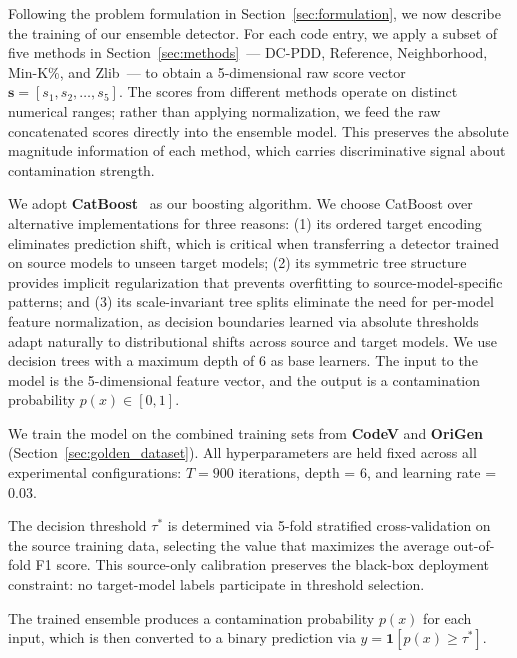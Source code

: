 Following the problem formulation in Section~\ref{sec:formulation}, we now describe the training of our ensemble detector. For each code entry, we apply a subset of five methods in Section~\ref{sec:methods}~— DC-PDD, Reference, Neighborhood, Min-K\%, and Zlib~— to obtain a 5-dimensional raw score vector \(\mathbf{s} = [s_1, s_2, \ldots, s_5]\). The scores from different methods operate on distinct numerical ranges; rather than applying normalization, we feed the raw concatenated scores directly into the ensemble model. This preserves the absolute magnitude information of each method, which carries discriminative signal about contamination strength.

We adopt \textbf{CatBoost}~\cite{prokhorenkova2018catboost} as our boosting algorithm. We choose CatBoost over alternative implementations for three reasons: (1) its ordered target encoding eliminates prediction shift, which is critical when transferring a detector trained on source models to unseen target models; (2) its symmetric tree structure provides implicit regularization that prevents overfitting to source-model-specific patterns; and (3) its scale-invariant tree splits eliminate the need for per-model feature normalization, as decision boundaries learned via absolute thresholds adapt naturally to distributional shifts across source and target models. We use decision trees with a maximum depth of 6 as base learners. The input to the model is the 5-dimensional feature vector, and the output is a contamination probability \(p(x) \in [0,1]\).

We train the model on the combined training sets from \textbf{CodeV} and \textbf{OriGen} (Section~\ref{sec:golden_dataset}). All hyperparameters are held fixed across all experimental configurations: \(T = 900\) iterations, depth = 6, and learning rate = 0.03. 

The decision threshold \(\tau^*\) is determined via 5-fold stratified cross-validation on the source training data, selecting the value that maximizes the average out-of-fold F1 score. This source-only calibration preserves the black-box deployment constraint: no target-model labels participate in threshold selection.

The trained ensemble produces a contamination probability \(p(x)\) for each input, which is then converted to a binary prediction via \(\hat{y} = \mathbf{1}[p(x) \geq \tau^*]\).

